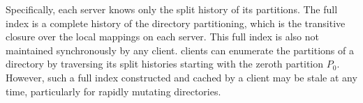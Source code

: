 Specifically, each server knows only the split history of its partitions.
The full \giga{} index is a complete history of the directory partitioning, 
which is the transitive closure over the local mappings on each server.
This full index is also not maintained synchronously by any client.
\giga{} clients can enumerate the partitions of a directory by traversing 
its split histories starting with the zeroth partition $P_0$.
However, such a full index constructed and cached by a client may be stale at
any time, particularly for rapidly mutating directories.




